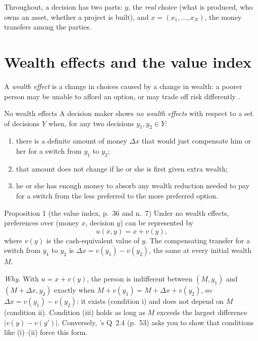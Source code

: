 Throughout, a decision has two parts: $y$, the \emph{real} choice (what is produced, who owns
an asset, whether a project is built), and $x = (x_1,\dots,x_N)$, the money transfers among the
parties.

\section{Wealth effects and the value index}\label{sec:b-wealth}

A \emph{wealth effect} is a change in choices caused by a change in wealth: a poorer person may
be unable to afford an option, or may trade off risk differently .

\begin{defn}{No wealth effects }
A decision maker shows \emph{no wealth effects} with respect to a set of decisions $Y$ when, for
any two decisions $y_1, y_2 \in Y$:
\begin{enumerate}[label=(\roman*)]
  \item there is a definite amount of money $\Delta x$ that would just compensate him or her for
  a switch from $y_1$ to $y_2$;
  \item that amount does not change if he or she is first given extra wealth;
  \item he or she has enough money to absorb any wealth reduction needed to pay for a switch
  from the less preferred to the more preferred option.
\end{enumerate}
\end{defn}

\begin{prop}{Proposition 1 (the value index, \MR{} p.~36 and n.~7)}
Under no wealth effects, preferences over (money $x$, decision $y$) can be represented by
\[
  u(x, y) = x + v(y),
\]
where $v(y)$ is the cash-equivalent value of $y$. The compensating transfer for a switch from
$y_1$ to $y_2$ is $\Delta x = v(y_1) - v(y_2)$, the same at every initial wealth $M$.
\end{prop}

\emph{Why.} With $u = x + v(y)$, the person is indifferent between $(M, y_1)$ and
$(M + \Delta x, y_2)$ exactly when $M + v(y_1) = M + \Delta x + v(y_2)$, so
$\Delta x = v(y_1) - v(y_2)$: it exists (condition i) and does not depend on $M$ (condition ii).
Condition (iii) holds as long as $M$ exceeds the largest difference $|v(y) - v(y')|$. Conversely,
\MR's Q~2.4 (p.~53) asks you to show that conditions like (i)--(ii) force this form.

